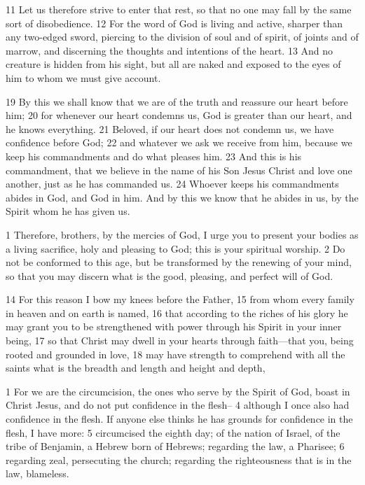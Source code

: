 \begin{bible}
11 Let us therefore strive to enter that rest, so that no one may fall by the same sort of disobedience. 12 For the word of God is living and active, sharper than any two-edged sword, piercing to the division of soul and of spirit, of joints and of marrow, and discerning the thoughts and intentions of the heart. 13 And no creature is hidden from his sight, but all are naked and exposed to the eyes of him to whom we must give account.

19 By this we shall know that we are of the truth and reassure our heart before him; 20 for whenever our heart condemns us, God is greater than our heart, and he knows everything. 21 Beloved, if our heart does not condemn us, we have confidence before God; 22 and whatever we ask we receive from him, because we keep his commandments and do what pleases him. 23 And this is his commandment, that we believe in the name of his Son Jesus Christ and love one another, just as he has commanded us. 24 Whoever keeps his commandments abides in God, and God in him. And by this we know that he abides in us, by the Spirit whom he has given us.

1 Therefore, brothers, by the mercies of God, I urge you to present your bodies as a living sacrifice, holy and pleasing to God; this is your spiritual worship. 2 Do not be conformed to this age, but be transformed by the renewing of your mind, so that you may discern what is the good, pleasing, and perfect will of God.

14 For this reason I bow my knees before the Father, 15 from whom every family in heaven and on earth is named, 16 that according to the riches of his glory he may grant you to be strengthened with power through his Spirit in your inner being, 17 so that Christ may dwell in your hearts through faith—that you, being rooted and grounded in love, 18 may have strength to comprehend with all the saints what is the breadth and length and height and depth,

1 For we are the circumcision, the ones who serve by the Spirit of God, boast in Christ Jesus, and do not put confidence in the flesh-- 4 although I once also had confidence in the flesh. If anyone else thinks he has grounds for confidence in the flesh, I have more: 5 circumcised the eighth day; of the nation of Israel, of the tribe of Benjamin, a Hebrew born of Hebrews; regarding the law, a Pharisee; 6 regarding zeal, persecuting the church; regarding the righteousness that is in the law, blameless.


\end{bible}
